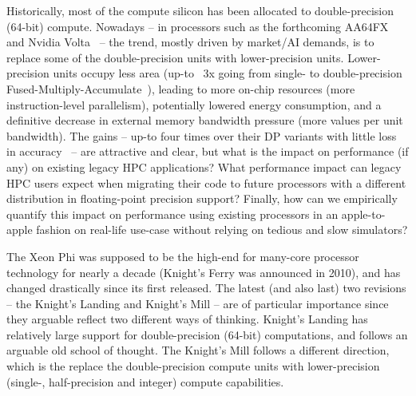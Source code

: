 Historically, most of the compute silicon has been allocated to double-precision (64-bit) compute.
Nowadays -- in processors such as the forthcoming AA64FX~\cite{yoshida_fujitsu_2018} and Nvidia
Volta~\cite{choquette_volta:_2018} -- the trend, mostly driven by market/AI demands, is to replace
some of the double-precision units with lower-precision units.
Lower-precision units occupy less area (up-to ~3x going from single- to double-precision
Fused-Multiply-Accumulate~\cite{pu_fpmax:_2016}), leading to more on-chip resources (more
instruction-level parallelism), potentially lowered energy consumption, and a definitive
decrease in external memory bandwidth pressure (more values per unit bandwidth).
The gains -- up-to four times over their DP variants with little loss in
accuracy~\cite{haidar_harnessing_2018} -- are attractive and clear, but what is the impact on
performance (if any) on existing legacy HPC applications? What performance impact can legacy
HPC users expect when migrating their code to future processors with a different distribution
in floating-point precision support? Finally, how can we empirically quantify this impact on
performance using existing processors in an apple-to-apple fashion on real-life use-case
without relying on tedious and slow simulators? %

The Xeon Phi was supposed to be the high-end for many-core processor technology for nearly
a decade (Knight’s Ferry was announced in 2010), and has changed drastically since its first released.
The latest (and also last) two revisions -- the Knight’s Landing and Knight’s Mill -- are of
particular importance since they arguable reflect two different ways of thinking. Knight’s Landing
has relatively large support for double-precision (64-bit) computations, and follows an arguable
old school of thought. The Knight’s Mill follows a different direction, which is the replace
the double-precision compute units with lower-precision (single-, half-precision and integer)
compute capabilities.

